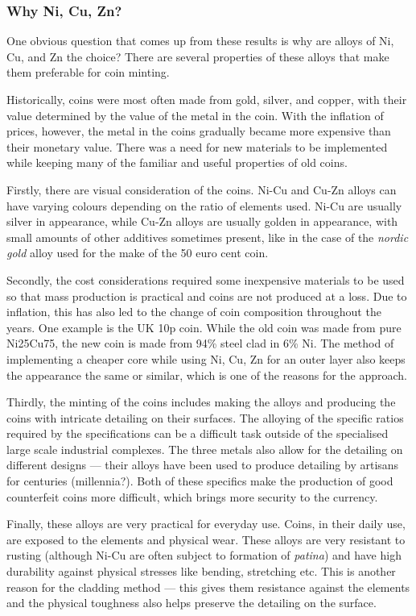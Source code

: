 \documentclass[11pt,a4paper,twoside,onecolumn]{article}
\begin{document}
\subsubsection{Why Ni, Cu, Zn?}
One obvious question that comes up from these results is why are alloys of Ni, Cu, and Zn the choice? There are several properties of these alloys that make them preferable for coin minting.

Historically, coins were most often made from gold, silver, and copper, with their value determined by the value of the metal in the coin. With the inflation of prices, however, the metal in the coins gradually became more expensive than their monetary value. There was a need for new materials to be implemented while keeping many of the familiar and useful properties of old coins.

Firstly, there are visual consideration of the coins. Ni-Cu and Cu-Zn alloys can have varying colours depending on the ratio of elements used. Ni-Cu are usually silver in appearance, while Cu-Zn alloys are usually golden in appearance, with small amounts of other additives sometimes present, like in the case of the \emph{nordic gold} alloy used for the make of the 50 euro cent coin.

Secondly, the cost considerations required some inexpensive materials to be used so that mass production is practical and coins are not produced at a loss. Due to inflation, this has also led to the change of coin composition throughout the years. One example is the UK 10p coin. While the old coin was made from pure Ni25Cu75, the new coin is made from 94\% steel clad in 6\% Ni. The method of implementing a cheaper core while using Ni, Cu, Zn for an outer layer also keeps the appearance the same or similar, which is one of the reasons for the approach.

Thirdly, the minting of the coins includes making the alloys and producing the coins with intricate detailing on their surfaces. The alloying of the specific ratios required by the specifications can be a difficult task outside of the specialised large scale industrial complexes. The three metals also allow for the detailing on different designs --- their alloys have been used to produce detailing by artisans for centuries (millennia?). Both of these specifics make the production of good counterfeit coins more difficult, which brings more security to the currency.

Finally, these alloys are very practical for everyday use. Coins, in their daily use, are exposed to the elements and physical wear. These alloys are very resistant to rusting (although Ni-Cu are often subject to formation of \emph{patina}) and have high durability against physical stresses like bending, stretching etc. This is another reason for the cladding method --- this gives them resistance against the elements and the physical toughness also helps preserve the detailing on the surface.
\end{document}

